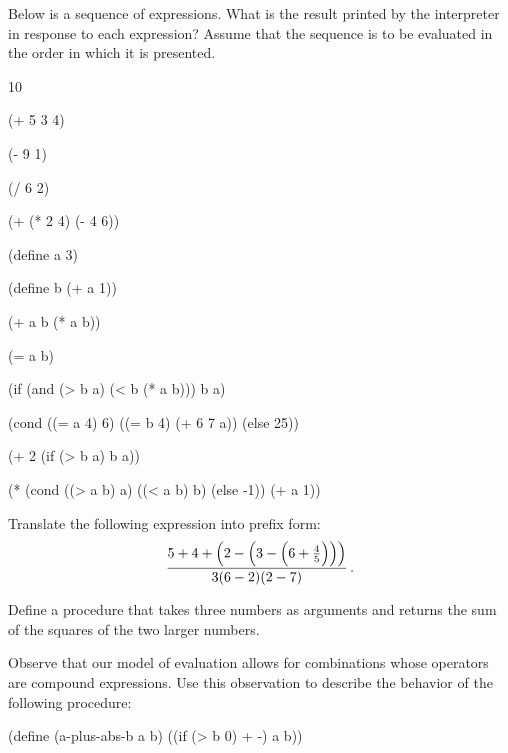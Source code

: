 \begin{exercise}
	\label{Exercise 1.1}
	Below is a sequence of expressions.
	What is the result printed by the interpreter in response to each expression?
	Assume that the sequence is to be evaluated in the order in which it is presented.
	\begin{scheme}
	  10

	  (+ 5 3 4)

	  (- 9 1)

	  (/ 6 2)

	  (+ (* 2 4) (- 4 6))

	  (define a 3)

	  (define b (+ a 1))

	  (+ a b (* a b))

	  (= a b)

	  (if (and (> b a) (< b (* a b)))
	      b
	      a)

	  (cond ((= a 4) 6)
	        ((= b 4) (+ 6 7 a))
	        (else 25))

	  (+ 2 (if (> b a) b a))

	  (* (cond ((> a b) a)
	          ((< a b) b)
	          (else -1))
	    (+ a 1))
	\end{scheme}
\end{exercise}



\begin{exercise}
	\label{Exercise 1.2}
	Translate the following expression into prefix form:
	\[
		\frac{
			5
			+ 4
			+ \Bigl(2 - \Bigl(3 - \Bigl(6 + \frac{4}{5}\Bigr)\Bigr)\Bigr)
		}{
			3 (6 - 2) (2 - 7)
		} \,.
	\]
\end{exercise}



\begin{exercise}
	\label{Exercise 1.3}
	Define a procedure that takes three numbers as arguments and returns the sum of the squares of the two larger numbers.
\end{exercise}



\begin{exercise}
	\label{Exercise 1.4}
	Observe that our model of evaluation allows for combinations whose operators are compound expressions.
	Use this observation to describe the behavior of the following procedure:
	\begin{scheme}
	  (define (a-plus-abs-b a b)
	    ((if (> b 0) + -) a b))
	\end{scheme}
\end{exercise}



